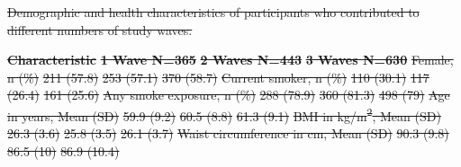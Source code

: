 \documentclass[
  letterpaper,
  DIV=11,
  numbers=noendperiod]{scrartcl}
\makeatletter
\renewenvironment{table}%
   {\renewcommand\familydefault\sfdefault
    \@float{table}}
   {\end@float}
\providecommand{\DIFadd}[1]{{\protect\color{blue}\underline{#1}}} %
\providecommand{\DIFdel}[1]{{\protect\color{red}\sout{#1}}}                      %
\providecommand{\DIFdelbegin}{} %
\providecommand{\DIFdelend}{} %
\providecommand{\DIFaddFL}[1]{\DIFadd{#1}} %
\providecommand{\DIFdelFL}[1]{\DIFdel{#1}} %
\providecommand{\DIFaddbeginFL}{} %
\providecommand{\DIFdelbeginFL}{} %
\providecommand{\DIFdelendFL}{} %
\newcommand{\DIFscaledelfig}{0.5}
\newlength{\DIFdelgraphicswidth} %
\newlength{\DIFdelgraphicsheight} %
\newcommand{\DIFaddincludegraphics}[2][]{{\color{blue}\fbox{\DIFOincludegraphics[#1]{#2}}}} %
\newcommand{\DIFdelincludegraphics}[2][]{%
\sbox{\DIFdelgraphicsbox}{\DIFOincludegraphics[#1]{#2}}%
\settoboxwidth{\DIFdelgraphicswidth}{\DIFdelgraphicsbox} %
\settoboxtotalheight{\DIFdelgraphicsheight}{\DIFdelgraphicsbox} %
\scalebox{\DIFscaledelfig}{%
\parbox[b]{\DIFdelgraphicswidth}{\usebox{\DIFdelgraphicsbox}\\[-\baselineskip] \rule{\DIFdelgraphicswidth}{0em}}\llap{\resizebox{\DIFdelgraphicswidth}{\DIFdelgraphicsheight}{%
\setlength{\unitlength}{\DIFdelgraphicswidth}%
\begin{picture}(1,1)%
\thicklines\linethickness{2pt} %
{\color[rgb]{1,0,0}\put(0,0){\framebox(1,1){}}}%
{\color[rgb]{1,0,0}\put(0,0){\line( 1,1){1}}}%
{\color[rgb]{1,0,0}\put(0,1){\line(1,-1){1}}}%
\end{picture}%
}\hspace*{3pt}}} %
} %
\DeclareRobustCommand{\DIFdelbegin}{\DIFOdelbegin \let\includegraphics\DIFdelincludegraphics} %
\DeclareRobustCommand{\DIFdelend}{\DIFOaddend \let\includegraphics\DIFOincludegraphics} %
\DeclareRobustCommand{\DIFaddbeginFL}{\DIFOaddbeginFL \let\includegraphics\DIFaddincludegraphics} %
\DeclareRobustCommand{\DIFdelbeginFL}{\DIFOdelbeginFL \let\includegraphics\DIFdelincludegraphics} %
\DeclareRobustCommand{\DIFdelendFL}{\DIFOaddendFL \let\includegraphics\DIFOincludegraphics} %
\makeatother
\begin{document}
\DIFdelbegin %
\DIFdelend \begin{table}
\DIFdelbeginFL %
{%
\DIFdelFL{Demographic and health characteristics of participants who contributed
to different numbers of study waves. }}%
\DIFdelendFL 

\DIFdelbeginFL %
\textbf{\DIFdelFL{Characteristic}} %
\textbf{\DIFdelFL{1 Wave N=365}} %
\textbf{\DIFdelFL{2 Waves N=443}} %
\textbf{\DIFdelFL{3 Waves N=630}}%
\DIFdelFL{Female, n (\%) }%
\DIFdelFL{211 (57.8) }%
\DIFdelFL{253 (57.1) }%
\DIFdelFL{370 (58.7)}%
\DIFdelFL{Current smoker, n (\%) }%
\DIFdelFL{110 (30.1) }%
\DIFdelFL{117 (26.4) }%
\DIFdelFL{161 (25.6)}%
\DIFdelFL{Any smoke exposure, n (\%) }%
\DIFdelFL{288 (78.9) }%
\DIFdelFL{360 (81.3) }%
\DIFdelFL{498 (79)}%
\DIFdelFL{Age in years, Mean (SD) }%
\DIFdelFL{59.9 (9.2) }%
\DIFdelFL{60.5 (8.8) }%
\DIFdelFL{61.3 (9.1)}%
\DIFdelFL{BMI in kg/m\textsuperscript{2}, Mean (SD) }%
\DIFdelFL{26.3 (3.6) }%
\DIFdelFL{25.8 (3.5) }%
\DIFdelFL{26.1 (3.7)}%
\DIFdelFL{Waist circumference in cm, Mean (SD) }%
\DIFdelFL{90.3 (9.8) }%
\DIFdelFL{86.5 (10) }%
\DIFdelFL{86.9 (10.4)}%
\DIFdelendFL \DIFaddbeginFL \caption{\label{tbl-diff-campaign}\DIFaddFL{Demographic and health characteristics
of participants who contributed to different numbers of study waves.}}


\end{table}
\end{document}
